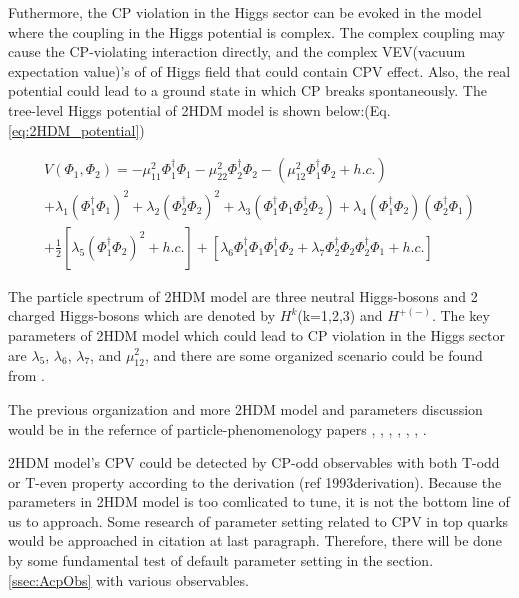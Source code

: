 			Futhermore, the CP violation in the Higgs sector can be evoked in the model where the coupling in the Higgs potential is complex. The complex coupling may cause the CP-violating interaction directly, and the complex VEV(vacuum expectation value)'s of of Higgs field that could contain CPV effect. Also, the real potential could lead to a ground state in which CP breaks spontaneously. The tree-level Higgs potential of 2HDM model is shown below:(Eq.\ref{eq:2HDM_potential})

			\begin{equation}
			\begin{split}
			V(\Phi_1, \Phi_2) = -\mu^2_{11} \Phi^{\dagger}_{1}\Phi_{1} -\mu^2_{22} \Phi^{\dagger}_{2}\Phi_{2} - ( \mu^2_{12} \Phi^{\dagger}_{1}\Phi_{2} + h.c.) \\
			+ \lambda_1(\Phi^{\dagger}_{1}\Phi_{1})^2 + \lambda_2(\Phi^{\dagger}_{2}\Phi_{2})^2 + \lambda_3(\Phi^{\dagger}_{1}\Phi_{1}\Phi^{\dagger}_{2}\Phi_{2}) + \lambda_4(\Phi^{\dagger}_{1}\Phi_{2})(\Phi^{\dagger}_{2}\Phi_{1})\\
			+ \frac{1}{2}[\lambda_5(\Phi^{\dagger}_{1}\Phi_{2})^2 + h.c. ] + [ \lambda_6 \Phi^{\dagger}_{1}\Phi_{1}\Phi^{\dagger}_{1}\Phi_{2} + \lambda_7 \Phi^{\dagger}_{2}\Phi_{2}\Phi^{\dagger}_{2}\Phi_{1} + h.c.]
			\label{eq:2HDM_potential}
			\end{split}
			\end{equation}
			\FloatBarrier

			The particle spectrum of 2HDM model are three neutral Higgs-bosons and 2 charged Higgs-bosons which are denoted by $H^{k}$(k=1,2,3) and $H^{+(-)}$. The key parameters of 2HDM model which could lead to CP violation in the Higgs sector are $\lambda_5$, $\lambda_6$, $\lambda_7$, and $\mu_{12}^2$, and there are some organized scenario could be found from \cite{Atwood:2000tu}.

			The previous organization and more 2HDM model and parameters discussion would be in the refernce of particle-phenomenology papers \cite{Atwood:2000tu}, \cite{ElKaffas:2006gdt}, \cite{Khater:2003wq}, \cite{Keus:2015hva}, \cite{Iguro:2019zlc}, \cite{Bernreuther:1993hq}, \cite{Bernreuther:1998qv}. 

			2HDM model's CPV could be detected by CP-odd observables with both T-odd or T-even property according to the derivation (ref 1993derivation). Because the parameters in 2HDM model is too comlicated to tune, it is not the bottom line of us to approach. Some research of parameter setting related to CPV in top quarks would be approached in citation at last paragraph. Therefore, there will be done by some fundamental test of default parameter setting in the section.\ref{ssec:AcpObs} with various observables.



